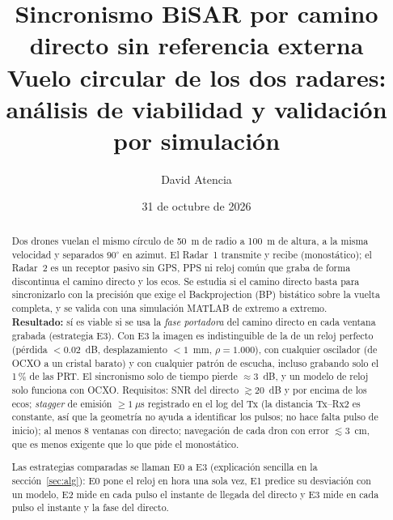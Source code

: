 \documentclass[11pt,a4paper]{article}
\title{Sincronismo BiSAR por camino directo sin referencia externa\\[2pt]
\large Vuelo circular de los dos radares: análisis de viabilidad y validación por simulación}
\author{David Atencia}
\date{31 de octubre de 2026}
\begin{document}
\maketitle

\begin{abstract}
\noindent
Dos drones vuelan el mismo círculo de 50~m de radio a 100~m de altura, a la
misma velocidad y separados 90$^\circ$ en azimut. El Radar~1 transmite y
recibe (monostático); el Radar~2 es un receptor pasivo sin GPS, PPS ni reloj
común que graba de forma discontinua el camino directo y los ecos. Se
estudia si el camino directo basta para sincronizarlo con la precisión que
exige el Backprojection (BP) bistático sobre la vuelta completa, y se valida
con una simulación MATLAB de extremo a extremo. \textbf{Resultado:} sí es
viable si se usa la \emph{fase portadora} del camino directo en cada ventana
grabada (estrategia E3). Con E3 la imagen es indistinguible de la de un
reloj perfecto (pérdida $<0.02$~dB, desplazamiento $<1$~mm, $\rho=1.000$),
con cualquier oscilador (de OCXO a un cristal barato) y con cualquier patrón
de escucha, incluso grabando solo el 1\,\% de las PRT. El sincronismo solo
de tiempo pierde $\approx3$~dB, y un modelo de reloj solo funciona con OCXO.
Requisitos: SNR del directo $\gtrsim20$~dB y por encima de los ecos;
\emph{stagger} de emisión $\ge1~\mu$s registrado en el log del Tx (la
distancia Tx--Rx2 es constante, así que la geometría no ayuda a identificar
los pulsos; no hace falta pulso de inicio); al menos 8 ventanas con directo;
navegación de cada dron con error $\lesssim3$~cm, que es menos exigente que
lo que pide el monostático.

\smallskip\noindent
Las estrategias comparadas se llaman E0 a E3 (explicación sencilla en la
sección~\ref{sec:alg}): E0 pone el reloj en hora una sola vez, E1 predice
su desviación con un modelo, E2 mide en cada pulso el instante de llegada
del directo y E3 mide en cada pulso el instante y la fase del directo.
\end{abstract}

\tableofcontents
\newpage
\end{document}
